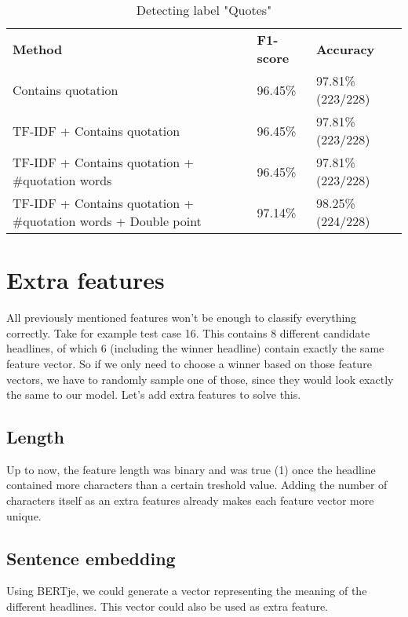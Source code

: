 \documentclass{article}
\begin{document}
\begin{table}[]
\begin{tabular}{lll}
\textbf{Method}                                                & \textbf{F1-score} & \textbf{Accuracy} \\
Contains quotation                                             & 96.45\%           & 97.81\% (223/228) \\
TF-IDF + Contains quotation                                    & 96.45\%           & 97.81\% (223/228) \\
TF-IDF + Contains quotation + \#quotation words                & 96.45\%           & 97.81\% (223/228) \\
TF-IDF + Contains quotation + \#quotation words + Double point & 97.14\%           & 98.25\% (224/228)
\end{tabular}
\caption{Detecting label "Quotes"}
\label{tab:quotations}
\end{table}


\section{Extra features}
All previously mentioned features won't be enough to classify everything correctly. Take for example test case 16. This contains 8 different candidate headlines, of which 6 (including the winner headline) contain exactly the same feature vector. So if we only need to choose a winner based on those feature vectors, we have to randomly sample one of those, since they would look exactly the same to our model. Let's add extra features to solve this.

\subsection{Length}
Up to now, the feature length was binary and was true (1) once the headline contained more characters than a certain treshold value. Adding the number of characters itself as an extra features already makes each feature vector more unique.

\subsection{Sentence embedding}
Using BERTje, we could generate a vector representing the meaning of the different headlines. This vector could also be used as extra feature.
\end{document}
